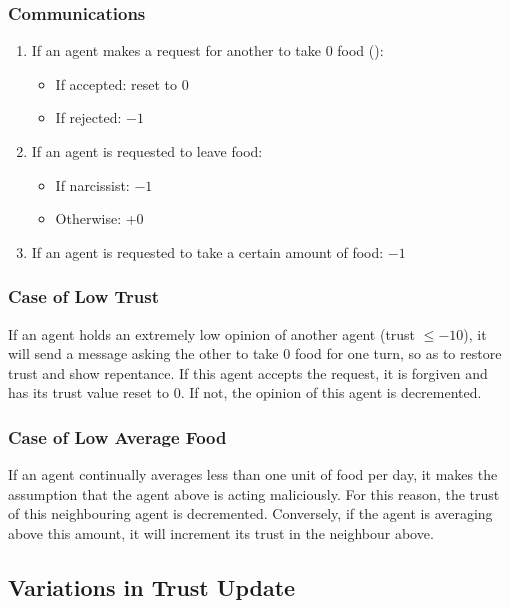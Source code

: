 \subsubsection{Communications}

\begin{enumerate}
    \item If an agent makes a request for another to take 0 food ():
    \begin{itemize}
        \item  If accepted: reset to 0
        \item  If rejected: $-1$
    \end{itemize}
    \item If an agent is requested to leave food: 
    \begin{itemize}
        \item If narcissist: $-1$
        \item Otherwise: +0
    \end{itemize}
    \item If an agent is requested to take a certain amount of food: $-1$
\end{enumerate}

\subsubsection{Case of Low Trust} \label{sec:takeNone}

If an agent holds an extremely low opinion of another agent (trust $\leq -10$), it will send a message asking the other to take 0 food for one turn, so as to restore trust and show repentance. If this agent accepts the request, it is forgiven and has its trust value reset to 0. If not, the opinion of this agent is decremented.

\subsubsection{Case of Low Average Food} \label{sec:lowFood}

If an agent continually averages less than one unit of food per day, it makes the assumption that the agent above is acting maliciously. For this reason, the trust of this neighbouring agent is decremented. Conversely, if the agent is averaging above this amount, it will increment its trust in the neighbour above.

\subsection{Variations in Trust Update} \label{sec:varTrust}

